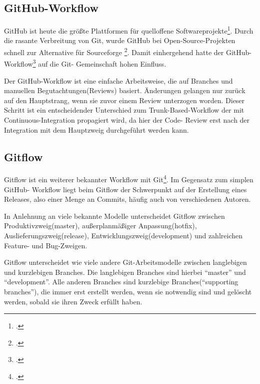 \subsection{GitHub-Workflow}

GitHub ist heute die größte Plattformen für quelloffene Softwareprojekte\footcite{github-marketshare-datanyze}. Durch die 
rasante Verbreitung von Git, wurde GitHub bei Open-Source-Projekten schnell zur Alternative für Sourceforge
\footcite{heise-github-2011}. Damit einhergehend hatte der GitHub-Workflow\footcite{github-workflow-intro} auf die Git-
Gemeinschaft hohen Einfluss.

Der GitHub-Workflow ist eine einfache Arbeitsweise, die auf Branches und manuellen Begutachtungen(Reviews) basiert. 
Änderungen gelangen nur zurück auf den Hauptstrang, wenn sie zuvor einem Review unterzogen worden. Dieser Schritt ist ein 
entscheidender Unterschied zum Trunk-Based-Workflow der mit Continuous-Integration propagiert wird, da hier der Code-
Review erst nach der Integration mit dem Hauptzweig durchgeführt werden kann.

\subsection{Gitflow}

Gitflow ist ein weiterer bekannter Workflow mit Git\footcite{nvie-git-branch-model}. Im Gegensatz zum simplen GitHub-
Workflow liegt beim Gitflow der Schwerpunkt auf der Erstellung eines Releases, also einer Menge an Commits, häufig auch
von verschiedenen Autoren.

In Anlehnung an viele bekannte Modelle unterscheidet Gitflow zwischen Produktivzweig(master), außerplanmäßiger 
Anpassung(hotfix), Auslieferungszweig(release), Entwicklungszweig(development) und zahlreichen Feature- und Bug-Zweigen.

Gitflow unterscheidet wie viele andere Git-Arbeitsmodelle zwischen langlebigen und kurzlebigen Branches. Die langlebigen 
Branches sind hierbei ``master'' und ``development''. Alle anderen Branches sind kurzlebige Branches(``supporting 
branches''), die immer erst erstellt werden, wenn sie notwendig sind und gelöscht werden, sobald sie ihren Zweck erfüllt 
haben.

